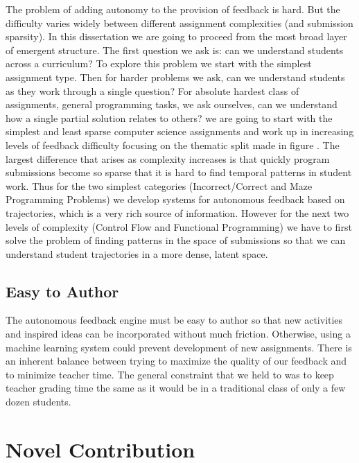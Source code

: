 The problem of adding autonomy to the provision of feedback is hard. But the difficulty varies widely between different assignment complexities (and submission sparsity). In this dissertation we are going to proceed from the most broad layer of emergent structure. The first question we ask is: can we understand students across a curriculum? To explore this problem we start with the simplest assignment type. Then for harder problems we ask, can we understand students as they work through a single question? For absolute hardest class of assignments, general programming tasks, we ask ourselves, can we understand how a single partial solution relates to others? we are going to start with the simplest and least sparse computer science assignments and work up in increasing levels of feedback difficulty focusing on the thematic split made in figure \cite{fig:assnTypes}. The largest difference that arises as complexity increases is that quickly program submissions become so sparse that it is hard to find temporal patterns in student work. Thus for the two simplest categories (Incorrect/Correct and Maze Programming Problems) we develop systems for autonomous feedback based on trajectories, which is a very rich source of information. However for the next two levels of complexity (Control Flow and Functional Programming) we have to first solve the problem of finding patterns in the space of submissions so that we can understand student trajectories in a more dense, latent space. 

\subsection{Easy to Author}

The autonomous feedback engine must be easy to author so that new activities and inspired ideas can be incorporated without much friction. Otherwise, using a machine learning system could prevent development of new assignments. There is an inherent balance between trying to maximize the quality of our feedback and to minimize teacher time. The general constraint that we held to was to keep teacher grading time the same as it would be in a traditional class of only a few dozen students.

\section{Novel Contribution}

